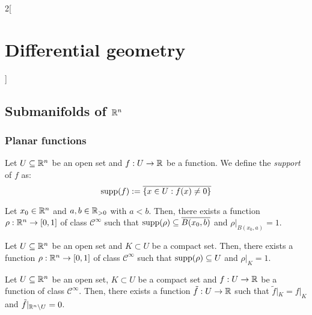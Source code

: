 \documentclass[../../../main_math.tex]{subfiles}
\begin{document}
\begin{multicols}{2}[\section{Differential geometry}]
  \subsection{Submanifolds of \texorpdfstring{$\mathbb{R}^n$}{Rn}}
  \subsubsection{Planar functions}
  \begin{definition}
    Let $U\subseteq\mathbb{R}^n$ be an open set and $f:U\rightarrow\mathbb{R}$ be a function. We define the \emph{support} of $f$ as:
    $$\operatorname{supp}(f):=\overline{\{x\in U:f(x)\ne 0\}}$$
  \end{definition}
  \begin{lemma}
    Let $x_0\in\mathbb{R}^n$ and $a,b\in \mathbb{R}_{>0}$ with $a<b$. Then, there exists a function $\rho:\mathbb{R}^n\rightarrow[0,1]$ of class $\mathcal{C}^\infty$ such that $\operatorname{supp}(\rho)\subseteq\overline{B(x_0,b)}$ and $\rho|_{B(x_0,a)}=1$.
  \end{lemma}
  \begin{proposition}
    Let $U\subseteq\mathbb{R}^n$ be an open set and $K\subset U$ be a compact set. Then, there exists a function $\rho:\mathbb{R}^n\rightarrow[0,1]$ of class $\mathcal{C}^\infty$ such that $\operatorname{supp}(\rho)\subseteq U$ and $\rho|_K=1$.
  \end{proposition}
  \begin{corollary}
    Let $U\subseteq\mathbb{R}^n$ be an open set, $K\subset U$ be a compact set and $f:U\rightarrow \mathbb{R}$ be a function of class $\mathcal{C}^\infty$. Then, there exists a function $\tilde{f}:U\rightarrow \mathbb{R}$ such that $\tilde{f}|_K=f|_K$ and $\tilde{f}|_{\mathbb{R}^n\setminus U}=0$.
  \end{corollary}

\end{multicols}
\end{document}
